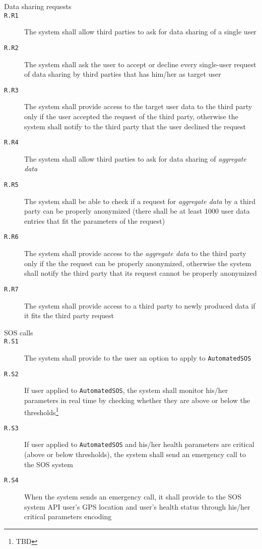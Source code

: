 \begin{description}
      \item[Data sharing requests]
      \item[\texttt{R.R1}] The system shall allow third parties to ask for data sharing of a single user
      \item[\texttt{R.R2}] The system shall ask the user to accept or decline every single-user request of data sharing by third parties that has him/her as target user
      \item[\texttt{R.R3}] The system shall provide access to the target user data to the third party only if the user accepted the request of the third party, otherwise the system shall notify to the third party that the user declined the request
      \item[\texttt{R.R4}] The system shall allow third parties to ask for data sharing of \textit{aggregate data}
      \item[\texttt{R.R5}] The system shall be able to check if a request for \textit{aggregate data} by a third party can be properly anonymized (there shall be at least 1000 user data entries that fit the parameters of the request)
      \item[\texttt{R.R6}] The system shall provide access to the \textit{aggregate data} to the third party only if the the request can be properly anonymized, otherwise the system shall notify the third party that its request cannot be properly anonymized
      \item[\texttt{R.R7}] The system shall provide access to a third party to newly produced data if it fits the third party request

      \item[SOS calls]
      \item[\texttt{R.S1}] The system shall provide to the user an option to apply to \texttt{AutomatedSOS}
      \item[\texttt{R.S2}] If user applied to \texttt{AutomatedSOS}, the system shall monitor his/her parameters in real time by checking whether they are above or below the thresholds\footnote{TBD
      }
      \item[\texttt{R.S3}] If user applied to \texttt{AutomatedSOS} and his/her health parameters are critical (above or below thresholds), the system shall send an emergency call to the SOS system
      \item[\texttt{R.S4}] When the system sends an emergency call, it shall provide to the SOS system API user's GPS location and user's health status through his/her critical parameters encoding

    \end{description}

